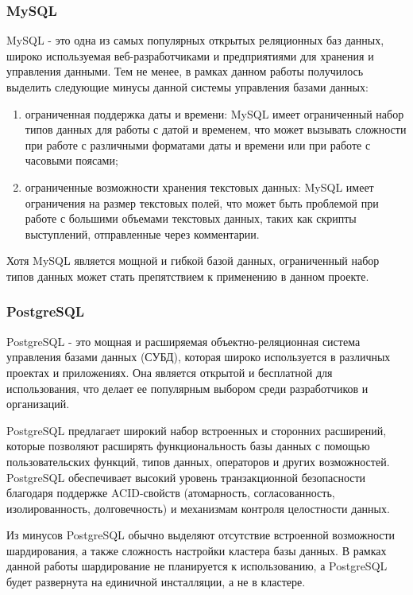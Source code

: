 \subsubsection{MySQL}

MySQL - это одна из самых популярных открытых реляционных баз данных, широко используемая веб-разработчиками и предприятиями для хранения и управления данными. Тем не менее, в рамках данном работы получилось выделить следующие минусы данной системы управления базами данных: 

\begin{enumerate}
	\item ограниченная поддержка даты и времени: MySQL имеет ограниченный набор типов данных для работы с датой и временем, что может вызывать сложности при работе с различными форматами даты и времени или при работе с часовыми поясами;
	\item ограниченные возможности хранения текстовых данных: MySQL имеет ограничения на размер текстовых полей, что может быть проблемой при работе с большими объемами текстовых данных, таких как скрипты выступлений, отправленные через комментарии.
\end{enumerate}

Хотя MySQL является мощной и гибкой базой данных, ограниченный набор типов данных может стать препятствием к применению в данном проекте.


\subsubsection{PostgreSQL}

PostgreSQL - это мощная и расширяемая объектно-реляционная система управления базами данных (СУБД), которая широко используется в различных проектах и приложениях. Она является открытой и бесплатной для использования, что делает ее популярным выбором среди разработчиков и организаций. 

PostgreSQL предлагает широкий набор встроенных и сторонних расширений, которые позволяют расширять функциональность базы данных с помощью пользовательских функций, типов данных, операторов и других возможностей. PostgreSQL обеспечивает высокий уровень транзакционной безопасности благодаря поддержке ACID-свойств (атомарность, согласованность, изолированность, долговечность) и механизмам контроля целостности данных.

Из минусов PostgreSQL обычно выделяют отсутствие встроенной возможности шардирования, а также сложность настройки кластера базы данных. В рамках данной работы шардирование не планируется к использованию, а PostgreSQL будет развернута на единичной инсталляции, а не в кластере.

